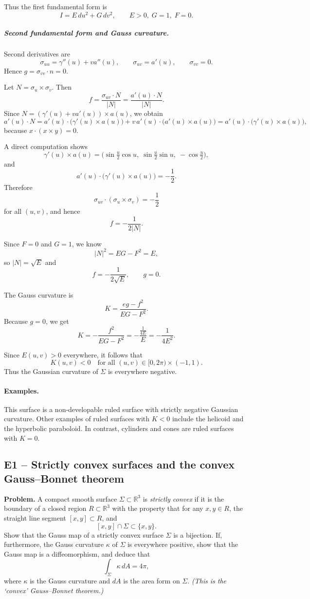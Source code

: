 \documentclass[12pt,a4paper]{article}
\theoremstyle{plain}
\theoremstyle{definition}      %
\begin{document}
Thus the first fundamental form is
\[
I = E\,du^2 + G\,dv^2,\qquad
E>0,\; G=1,\; F=0.
\]

\subparagraph{Second fundamental form and Gauss curvature.}
Second derivatives are
\[
\sigma_{uu}=\gamma''(u)+v a''(u),\qquad
\sigma_{uv}=a'(u),\qquad
\sigma_{vv}=0.
\]
Hence $g=\sigma_{vv}\cdot n=0$.

Let $N=\sigma_u\times\sigma_v$.
Then
\[
f = \frac{\sigma_{uv}\cdot N}{|N|}
= \frac{a'(u)\cdot N}{|N|}.
\]
Since $N=(\gamma'(u)+v a'(u))\times a(u)$, we obtain
\[
a'(u)\cdot N
= a'(u)\cdot\bigl(\gamma'(u)\times a(u)\bigr)
+ v\,a'(u)\cdot\bigl(a'(u)\times a(u)\bigr)
= a'(u)\cdot\bigl(\gamma'(u)\times a(u)\bigr),
\]
because $x\cdot(x\times y)=0$.

A direct computation shows
\[
\gamma'(u)\times a(u)
=\bigl(\sin\tfrac u2\cos u,\;\sin\tfrac u2\sin u,\;-\cos\tfrac u2\bigr),
\]
and
\[
a'(u)\cdot\bigl(\gamma'(u)\times a(u)\bigr)=-\frac12.
\]
Therefore
\[
\sigma_{uv}\cdot(\sigma_u\times\sigma_v) = -\frac12
\]
for all $(u,v)$, and hence
\[
f = -\frac{1}{2|N|}.
\]

Since $F=0$ and $G=1$, we know
\[
|N|^2 = EG-F^2 = E,
\]
so $|N|=\sqrt{E}$ and
\[
f = -\frac{1}{2\sqrt{E}},\qquad g=0.
\]

The Gauss curvature is
\[
K = \frac{eg-f^2}{EG-F^2}.
\]
Because $g=0$, we get
\[
K = -\frac{f^2}{EG-F^2}
= -\frac{\displaystyle\frac{1}{4E}}{E}
= -\frac{1}{4E^2}.
\]

Since $E(u,v)>0$ everywhere, it follows that
\[
K(u,v)<0\quad\text{for all }(u,v)\in[0,2\pi)\times(-1,1).
\]
Thus the Gaussian curvature of $\Sigma$ is everywhere negative.

\paragraph{Examples.}
This surface is a non-developable ruled surface with strictly negative
Gaussian curvature.  Other examples of ruled surfaces with $K<0$ include
the helicoid and the hyperbolic paraboloid.  In contrast, cylinders and
cones are ruled surfaces with $K=0$.

\subsection*{E1 – Strictly convex surfaces and the convex Gauss–Bonnet theorem}

\textbf{Problem.}
A compact smooth surface $\Sigma \subset \mathbb{R}^3$ is \emph{strictly convex}
if it is the boundary of a closed region $R \subset \mathbb{R}^3$ with the
property that for any $x,y \in R$, the straight line segment $[x,y] \subset R$,
and
\[
[x,y] \cap \Sigma \subset \{x,y\}.
\]
Show that the Gauss map of a strictly convex surface $\Sigma$ is a bijection.
If, furthermore, the Gauss curvature $\kappa$ of $\Sigma$ is everywhere
positive, show that the Gauss map is a diffeomorphism, and deduce that
\[
\int_{\Sigma} \kappa\, dA = 4\pi,
\]
where $\kappa$ is the Gauss curvature and $dA$ is the area form on $\Sigma$.
\emph{(This is the `convex' Gauss–Bonnet theorem.)}
\end{document}
